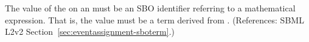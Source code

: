 The value of the   on an \EventAssignment must be an
SBO identifier referring to a mathematical expression.  That is, the value
must be a term derived from \sbomathformula.  (References: SBML L2v2
Section~\ref{sec:eventassignment-sboterm}.)
